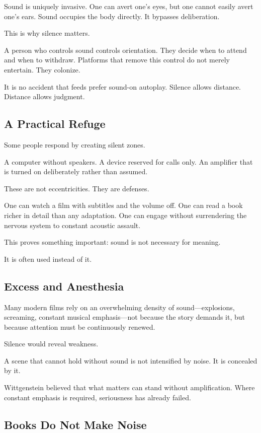 \documentclass[11pt]{article}
\begin{document}
Sound is uniquely invasive. One can avert one’s eyes, but one cannot easily avert one’s ears. Sound occupies the body directly. It bypasses deliberation.

This is why silence matters.

A person who controls sound controls orientation. They decide when to attend and when to withdraw. Platforms that remove this control do not merely entertain. They colonize.

It is no accident that feeds prefer sound-on autoplay. Silence allows distance. Distance allows judgment.

\subsection*{A Practical Refuge}

Some people respond by creating silent zones.

A computer without speakers.  
A device reserved for calls only.  
An amplifier that is turned on deliberately rather than assumed.

These are not eccentricities. They are defenses.

One can watch a film with subtitles and the volume off. One can read a book richer in detail than any adaptation. One can engage without surrendering the nervous system to constant acoustic assault.

This proves something important: sound is not necessary for meaning.

It is often used instead of it.

\subsection*{Excess and Anesthesia}

Many modern films rely on an overwhelming density of sound—explosions, screaming, constant musical emphasis—not because the story demands it, but because attention must be continuously renewed.

Silence would reveal weakness.

A scene that cannot hold without sound is not intensified by noise. It is concealed by it.

Wittgenstein believed that what matters can stand without amplification. Where constant emphasis is required, seriousness has already failed.

\subsection*{Books Do Not Make Noise}
\end{document}
